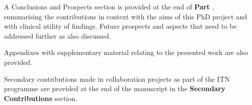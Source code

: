 A Conclusions and Prospects section is provided at the end of \textbf{Part }, summarising the contributions in context with the aims of this PhD project and with clinical utility of findings. Future prospects and aspects that need to be addressed further as also discussed.

Appendixes with supplementary material relating to the presented work are also provided.

Secondary contributions made in collaboration projects as part of the ITN programme are provided at the end of the manuscript in the \textbf{Secondary Contributions} section.